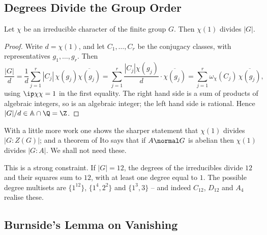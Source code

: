 \subsection{Degrees Divide the Group Order}

\begin{theorem}
	Let $\chi$ be an irreducible character of the finite group $G$. Then $\chi(1)$ divides $|G|$.
\end{theorem}
\begin{proof}
	Write $d = \chi(1)$, and let $C_1,\dots,C_r$ be the conjugacy classes, with representatives $g_1,\dots,g_r$. Then
	$$\frac{|G|}{d} = \frac{1}{d}\sum_{j=1}^r|C_j|\,\chi(g_j)\overline{\chi(g_j)} = \sum_{j=1}^r\frac{|C_j|\chi(g_j)}{d}\cdot\overline{\chi(g_j)} = \sum_{j=1}^r\omega_\chi(C_j)\,\overline{\chi(g_j)},$$
	using $\ip\chi\chi = 1$ in the first equality. The right hand side is a sum of products of algebraic integers, so is an algebraic integer; the left hand side is rational. Hence $|G|/d\in\mathbb A\cap\Q = \Z$.
\end{proof}

\begin{remark}
	With a little more work one shows the sharper statement that $\chi(1)$ divides $|G:Z(G)|$; and a theorem of Ito says that if $A\normal G$ is abelian then $\chi(1)$ divides $|G:A|$. We shall not need these.
\end{remark}

\begin{example}
	This is a strong constraint. If $|G| = 12$, the degrees of the irreducibles divide $12$ and their squares sum to $12$, with at least one degree equal to $1$. The possible degree multisets are $\{1^{12}\}$, $\{1^4,2^2\}$ and $\{1^3,3\}$ -- and indeed $C_{12}$, $D_{12}$ and $A_4$ realise these.
\end{example}

\subsection{Burnside's Lemma on Vanishing}

